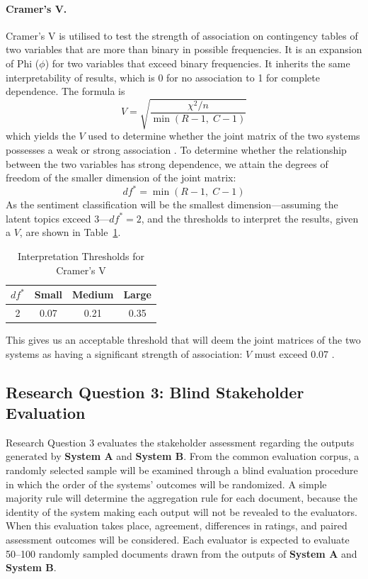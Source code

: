 \documentclass[12pt,a4paper]{report}
\newcommand{\sysA}{\textbf{System A}}
\newcommand{\sysB}{\textbf{System B}}
\begin{document}
\paragraph{Cramer's V.} Cramer's V is utilised to test the strength of
association on contingency tables of two variables that are more than binary in
possible frequencies. It is an expansion of Phi ($\phi$) for two variables that
exceed binary frequencies. It inherits the same interpretability of results,
which is 0 for no association to 1 for complete dependence. The formula is
\begin{equation}
  V = \sqrt{\frac{\chi^2 / n}{\min(R - 1,\; C - 1)}}
  \label{eq:cramersv}
\end{equation}
which yields the $V$ used to determine whether the joint matrix of the two
systems possesses a weak or strong association \parencite{benshachar2023}. To
determine whether the relationship between the two variables has strong
dependence, we attain the degrees of freedom of the smaller dimension of the
joint matrix:
\begin{equation}
  df^{*} = \min(R - 1,\; C - 1)
  \label{eq:dast}
\end{equation}
As the sentiment classification will be the smallest dimension---assuming the
latent topics exceed 3---$df^{*} = 2$, and the thresholds to interpret the
results, given a $V$, are shown in Table~\ref{tab:cramersv}.

\begin{table}[htbp]
  \centering
  \caption{Interpretation Thresholds for Cramer's V}
  \label{tab:cramersv}
  \begin{tabular}{cccc}
    \toprule
    \textbf{$df^{*}$} & \textbf{Small} & \textbf{Medium} & \textbf{Large} \\
    \midrule
    2 & 0.07 & 0.21 & 0.35 \\
    \bottomrule
  \end{tabular}
\end{table}

This gives us an acceptable threshold that will deem the joint matrices of the
two systems as having a significant strength of association: $V$ must exceed
0.07 \parencite{casrai2026}.

\subsection{Research Question 3: Blind Stakeholder Evaluation}

Research Question 3 evaluates the stakeholder assessment regarding the outputs
generated by \sysA{} and \sysB. From the common evaluation corpus, a randomly
selected sample will be examined through a blind evaluation procedure in which
the order of the systems' outcomes will be randomized. A simple majority rule
will determine the aggregation rule for each document, because the identity of
the system making each output will not be revealed to the evaluators. When this
evaluation takes place, agreement, differences in ratings, and paired
assessment outcomes will be considered. Each evaluator is expected to evaluate
50--100 randomly sampled documents drawn from the outputs of \sysA{} and
\sysB.
\end{document}
